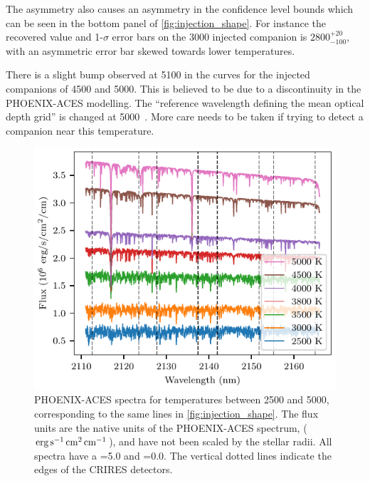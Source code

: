 The asymmetry also causes an asymmetry in the confidence level bounds which can be seen in the bottom panel of \cref{fig:injection_shape}.
For instance the recovered value and 1-\(\sigma\) error bars on the 3000\K{} injected companion is \(2800 ^{+20}_{-100}\), with an asymmetric error bar skewed towards lower temperatures.

There is a slight bump observed at 5100\K{} in the \textchisquared{} curves for the injected companions of 4500 and 5000\K{}.
This is believed to be due to a discontinuity in the {PHOENIX-ACES} modelling.
The ``reference wavelength defining the mean optical depth grid'' is changed at 5000\K{}~\citep[][Section~2.3]{husser_new_2013}.
More care needs to be taken if trying to detect a companion near this temperature.

\begin{figure}
    \centering
    \includegraphics[width=0.8\linewidth]{./figures/companion_recovery/companion_spectra.pdf}
    \caption[{PHOENIX-ACES} spectra for temperatures between 2500 and 5000\K{}.]{{PHOENIX-ACES} spectra for temperatures between 2500 and 5000\K{}, corresponding to the same lines in \cref{fig:injection_shape}.
        The flux units are the native units of the {PHOENIX-ACES} spectrum, (\(\rm erg\,s^{-1}\,cm^{2}\,cm^{-1}\)), and have not been scaled by the stellar radii.
        All spectra have a \Logg{}=5.0 and \feh{}=0.0.
        The vertical dotted lines indicate the edges of the CRIRES detectors.}
    \label{fig:comp_spectra}
\end{figure}

